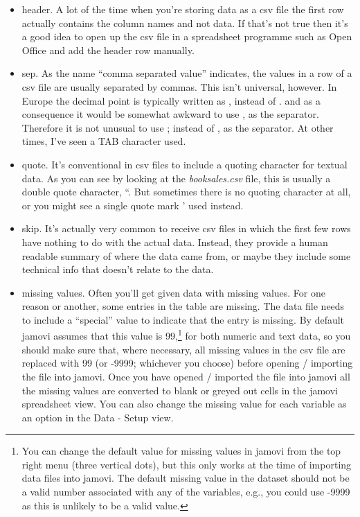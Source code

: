 \documentclass[
  a4paper,
]{book}
\providecommand{\tightlist}{%
  \setlength{\itemsep}{0pt}\setlength{\parskip}{0pt}}\usepackage{longtable,booktabs,array}
\begin{document}
\begin{itemize}
\tightlist
\item
  header. A lot of the time when you're storing data as a csv file the
  first row actually contains the column names and not data. If that's
  not true then it's a good idea to open up the csv file in a
  spreadsheet programme such as Open Office and add the header row
  manually.
\item
  sep. As the name ``comma separated value'' indicates, the values in a
  row of a csv file are usually separated by commas. This isn't
  universal, however. In Europe the decimal point is typically written
  as , instead of . and as a consequence it would be somewhat awkward to
  use , as the separator. Therefore it is not unusual to use ; instead
  of , as the separator. At other times, I've seen a TAB character used.
\item
  quote. It's conventional in csv files to include a quoting character
  for textual data. As you can see by looking at the
  \emph{booksales.csv} file, this is usually a double quote character,
  ``. But sometimes there is no quoting character at all, or you might
  see a single quote mark ' used instead.
\item
  skip. It's actually very common to receive csv files in which the
  first few rows have nothing to do with the actual data. Instead, they
  provide a human readable summary of where the data came from, or maybe
  they include some technical info that doesn't relate to the data.
\item
  missing values. Often you'll get given data with missing values. For
  one reason or another, some entries in the table are missing. The data
  file needs to include a ``special'' value to indicate that the entry
  is missing. By default jamovi assumes that this value is
  99,\footnote{You can change the default value for missing values in
    jamovi from the top right menu (three vertical dots), but this only
    works at the time of importing data files into jamovi. The default
    missing value in the dataset should not be a valid number associated
    with any of the variables, e.g., you could use -9999 as this is
    unlikely to be a valid value.} for both numeric and text data, so
  you should make sure that, where necessary, all missing values in the
  csv file are replaced with 99 (or -9999; whichever you choose) before
  opening / importing the file into jamovi. Once you have opened /
  imported the file into jamovi all the missing values are converted to
  blank or greyed out cells in the jamovi spreadsheet view. You can also
  change the missing value for each variable as an option in the Data -
  Setup view.
\end{itemize}
\end{document}
